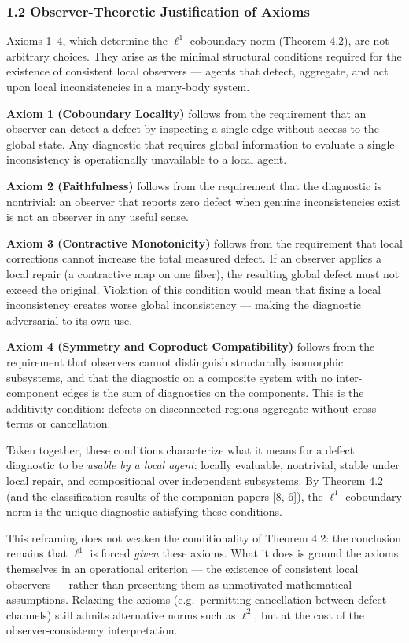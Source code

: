 \documentclass[
]{article}
\begin{document}
\subsubsection{1.2 Observer-Theoretic Justification of
Axioms}\label{observer-theoretic-justification-of-axioms}

Axioms 1--4, which determine the \(\ell^1\) coboundary norm (Theorem
4.2), are not arbitrary choices. They arise as the minimal structural
conditions required for the existence of consistent local observers ---
agents that detect, aggregate, and act upon local inconsistencies in a
many-body system.

\textbf{Axiom 1 (Coboundary Locality)} follows from the requirement that
an observer can detect a defect by inspecting a single edge without
access to the global state. Any diagnostic that requires global
information to evaluate a single inconsistency is operationally
unavailable to a local agent.

\textbf{Axiom 2 (Faithfulness)} follows from the requirement that the
diagnostic is nontrivial: an observer that reports zero defect when
genuine inconsistencies exist is not an observer in any useful sense.

\textbf{Axiom 3 (Contractive Monotonicity)} follows from the requirement
that local corrections cannot increase the total measured defect. If an
observer applies a local repair (a contractive map on one fiber), the
resulting global defect must not exceed the original. Violation of this
condition would mean that fixing a local inconsistency creates worse
global inconsistency --- making the diagnostic adversarial to its own
use.

\textbf{Axiom 4 (Symmetry and Coproduct Compatibility)} follows from the
requirement that observers cannot distinguish structurally isomorphic
subsystems, and that the diagnostic on a composite system with no
inter-component edges is the sum of diagnostics on the components. This
is the additivity condition: defects on disconnected regions aggregate
without cross-terms or cancellation.

Taken together, these conditions characterize what it means for a defect
diagnostic to be \emph{usable by a local agent}: locally evaluable,
nontrivial, stable under local repair, and compositional over
independent subsystems. By Theorem 4.2 (and the classification results
of the companion papers {[}8, 6{]}), the \(\ell^1\) coboundary norm is
the unique diagnostic satisfying these conditions.

This reframing does not weaken the conditionality of Theorem 4.2: the
conclusion remains that \(\ell^1\) is forced \emph{given} these axioms.
What it does is ground the axioms themselves in an operational criterion
--- the existence of consistent local observers --- rather than
presenting them as unmotivated mathematical assumptions. Relaxing the
axioms (e.g.~permitting cancellation between defect channels) still
admits alternative norms such as \(\ell^2\), but at the cost of the
observer-consistency interpretation.
\end{document}
